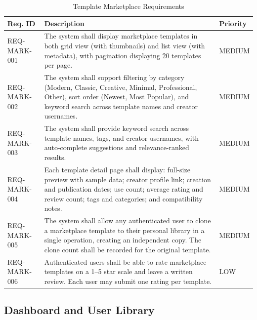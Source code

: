 \documentclass[12pt, a4paper, oneside]{report}
\begin{document}
\begin{table}[H]
\centering
\caption{Template Marketplace Requirements}
\label{tab:req_marketplace}
\renewcommand{\arraystretch}{1.5}
\begin{tabularx}{\textwidth}{|p{3cm}|X|p{2cm}|}
\hline
\textbf{Req. ID} & \textbf{Description} & \textbf{Priority} \\
\hline
REQ-MARK-001 & The system shall display marketplace templates in both grid view (with thumbnails) and list view (with metadata), with pagination displaying 20 templates per page. & MEDIUM \\
\hline
REQ-MARK-002 & The system shall support filtering by category (Modern, Classic, Creative, Minimal, Professional, Other), sort order (Newest, Most Popular), and keyword search across template names and creator usernames. & MEDIUM \\
\hline
REQ-MARK-003 & The system shall provide keyword search across template names, tags, and creator usernames, with auto-complete suggestions and relevance-ranked results. & MEDIUM \\
\hline
REQ-MARK-004 & Each template detail page shall display: full-size preview with sample data; creator profile link; creation and publication dates; use count; average rating and review count; tags and categories; and compatibility notes. & MEDIUM \\
\hline
REQ-MARK-005 & The system shall allow any authenticated user to clone a marketplace template to their personal library in a single operation, creating an independent copy. The clone count shall be recorded for the original template. & MEDIUM \\
\hline
REQ-MARK-006 & Authenticated users shall be able to rate marketplace templates on a 1--5 star scale and leave a written review. Each user may submit one rating per template. & LOW \\
\hline
\end{tabularx}
\end{table}

\subsection{Dashboard and User Library}
\end{document}
